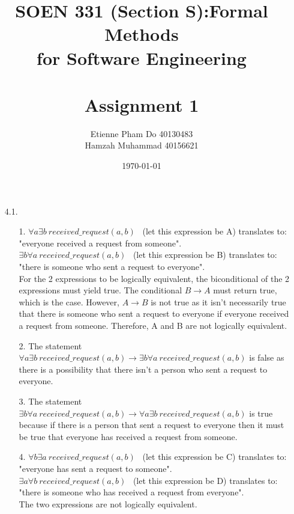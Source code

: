 \documentclass[12pt]{article}
\title{SOEN 331 (Section S):Formal Methods\\for Software Engineering\\
\ \\
Assignment 1}
\author{Etienne Pham Do 40130483\\Hamzah Muhammad 40156621}
\date{\today}
\begin{document}
\maketitle



\newpage
\begin{enumerate}

\item[4.1.]
\begin{enumerate}
    \item[1.]
    \noindent $\forall a \exists b \ received\_request(a,b)$ \ (let this expression be A) translates to: "everyone received a request from someone".\\
    \noindent $\exists b \forall a \ received\_request(a,b)$ \ (let this expression be B) translates to: "there is someone who sent a request to everyone".\\
    \noindent For the 2 expressions to be logically equivalent, the biconditional of the 2 expressions must yield true. The conditional $B \rightarrow A$ must return true, which is the case. However, $A \rightarrow B$ is not true as it isn't necessarily true that there is someone who sent a request to everyone if everyone received a request from someone. Therefore, A and B are not logically equivalent.

    \item[2.]
    \noindent The statement $\forall a \exists b \ received\_request(a,b) \rightarrow \exists b \forall a \ received\_request(a,b)$ is false as there is a possibility that there isn't a person who sent a request to everyone.

    \item[3.]
    \noindent The statement $\exists b \forall a \ received\_request(a,b) \rightarrow \forall a \exists b \ received\_request(a,b)$ is true because if there is a person that sent a request to everyone then it must be true that everyone has received a request from someone.

    \item[4.]
    \noindent $\forall b \exists a \ received\_request(a,b)$ \ (let this expression be C) translates to: "everyone has sent a request to someone".\\
    \noindent $\exists a \forall b \ received\_request(a,b)$ \ (let this expression be D) translates to: "there is someone who has received a request from everyone".\\
    \noindent The two expressions are not logically equivalent.
\end{enumerate}


\end{enumerate}
\end{document}

